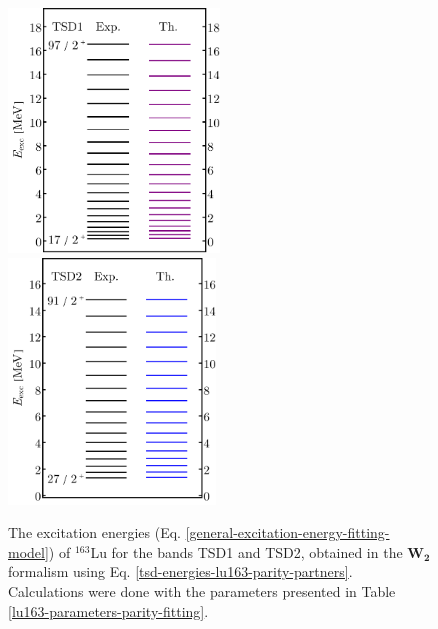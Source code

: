 \begin{figure}
    \centering
    \includegraphics[width=0.5\textwidth]{Chapters/Figures/parity-partners-plots/tsd1.pdf}
    \includegraphics[width=0.49\textwidth]{Chapters/Figures/parity-partners-plots/tsd2.pdf}
    \caption{The excitation energies (Eq. \ref{general-excitation-energy-fitting-model}) of $^{163}$Lu for the bands TSD1 and TSD2, obtained in the $\mathbf{W_2}$ formalism using Eq. \ref{tsd-energies-lu163-parity-partners}. Calculations were done with the parameters presented in Table \ref{lu163-parameters-parity-fitting}.}
    \label{results-parity-partners-163lu-1}
\end{figure}
